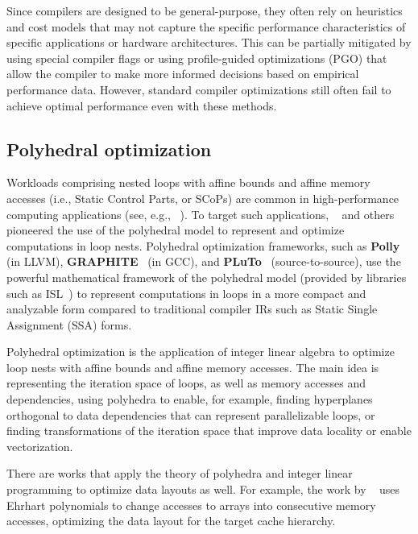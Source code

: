 Since compilers are designed to be general-purpose, they often rely on heuristics and cost models that may not capture the specific performance characteristics of specific applications or hardware architectures. This can be partially mitigated by using special compiler flags or using profile-guided optimizations (PGO) that allow the compiler to make more informed decisions based on empirical performance data. However, standard compiler optimizations still often fail to achieve optimal performance even with these methods.


\subsection{Polyhedral optimization}\label{sec:polyhedral-optimization}

Workloads comprising nested loops with affine bounds and affine memory accesses (i.e., Static Control Parts, or SCoPs) are common in high-performance computing applications (see, e.g., \citeauthor{bacon1994compiler}~\cite{bacon1994compiler}). To target such applications, \citeauthor{feautrier1992some}~\cite{feautrier1992some} and others pioneered the use of the polyhedral model to represent and optimize computations in loop nests. Polyhedral optimization frameworks, such as \textbf{Polly}~\cite{grosser2012polly} (in LLVM), \textbf{GRAPHITE}~\cite{trifunovic2010graphite} (in GCC), and \textbf{PLuTo}~\cite{bondhugula2008pluto} (source-to-source), use the powerful mathematical framework of the polyhedral model (provided by libraries such as ISL~\cite{verdoolaege2010isl}) to represent computations in loops in a more compact and analyzable form compared to traditional compiler IRs such as Static Single Assignment (SSA) forms.

Polyhedral optimization is the application of integer linear algebra to optimize loop nests with affine bounds and affine memory accesses. The main idea is representing the iteration space of loops, as well as memory accesses and dependencies, using polyhedra to enable, for example, finding hyperplanes orthogonal to data dependencies that can represent parallelizable loops, or finding transformations of the iteration space that improve data locality or enable vectorization.

There are works that apply the theory of polyhedra and integer linear programming to optimize data layouts as well. For example, the work by \citeauthor{clauss2000automatic}~\cite{clauss2000automatic} uses Ehrhart polynomials to change accesses to arrays into consecutive memory accesses, optimizing the data layout for the target cache hierarchy.

